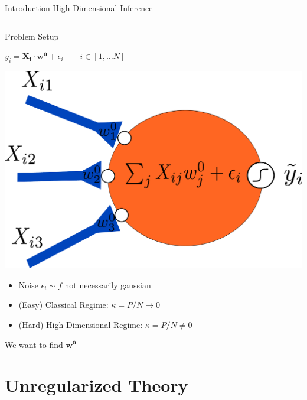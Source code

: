 \documentclass[pdf]{beamer}
\newcommand{\ra}{\rightarrow}
\begin{document}
\begin{frame}{Introduction High Dimensional Inference}
\begin{columns}[t]
\begin{column}{.45\textwidth}
\end{column}
\end{columns}

\end{frame}


\begin{frame}[t]{Problem Setup}


\parbox{.45\linewidth}{
$y_i = \mathbf{X_i}\cdot \mathbf{w^0} + \epsilon_i \quad \quad i\in [1,\dots N]$
}
\parbox{.45\linewidth}{
\begin{flushright}
\includegraphics[width = .5\linewidth]{neuronInference.pdf}
\end{flushright}
}


\begin{itemize}

\vspace{.05in}
\item Noise $\epsilon_i \sim f$ not necessarily gaussian
\vspace{.05in}
\item (Easy) Classical Regime: $\kappa = P/N\ra 0$
\vspace{.05in}
\item (Hard) High Dimensional Regime: $\kappa = P/N \ne 0$

\end{itemize}
\vspace{.2in}

We want to find $\mathbf{w^0}$
\end{frame}



\section{Unregularized Theory}
\frame{\sectionpage}
\end{document}
